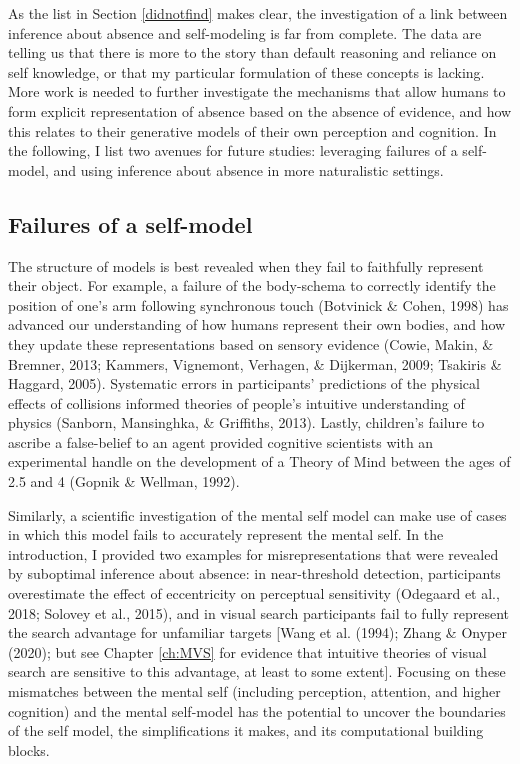 \documentclass[12pt,twoside]{reedthesis}
\begin{document}
As the list in Section \ref{didnotfind} makes clear, the investigation of a link between inference about absence and self-modeling is far from complete. The data are telling us that there is more to the story than default reasoning and reliance on self knowledge, or that my particular formulation of these concepts is lacking. More work is needed to further investigate the mechanisms that allow humans to form explicit representation of absence based on the absence of evidence, and how this relates to their generative models of their own perception and cognition. In the following, I list two avenues for future studies: leveraging failures of a self-model, and using inference about absence in more naturalistic settings.

\hypertarget{failures}{%
\subsection*{Failures of a self-model}\label{failures}}

The structure of models is best revealed when they fail to faithfully represent their object. For example, a failure of the body-schema to correctly identify the position of one's arm following synchronous touch (Botvinick \& Cohen, 1998) has advanced our understanding of how humans represent their own bodies, and how they update these representations based on sensory evidence (Cowie, Makin, \& Bremner, 2013; Kammers, Vignemont, Verhagen, \& Dijkerman, 2009; Tsakiris \& Haggard, 2005). Systematic errors in participants' predictions of the physical effects of collisions informed theories of people's intuitive understanding of physics (Sanborn, Mansinghka, \& Griffiths, 2013). Lastly, children's failure to ascribe a false-belief to an agent provided cognitive scientists with an experimental handle on the development of a Theory of Mind between the ages of 2.5 and 4 (Gopnik \& Wellman, 1992).

Similarly, a scientific investigation of the mental self model can make use of cases in which this model fails to accurately represent the mental self. In the introduction, I provided two examples for misrepresentations that were revealed by suboptimal inference about absence: in near-threshold detection, participants overestimate the effect of eccentricity on perceptual sensitivity (Odegaard et al., 2018; Solovey et al., 2015), and in visual search participants fail to fully represent the search advantage for unfamiliar targets {[}Wang et al. (1994); Zhang \& Onyper (2020); but see Chapter \ref{ch:MVS} for evidence that intuitive theories of visual search are sensitive to this advantage, at least to some extent{]}. Focusing on these mismatches between the mental self (including perception, attention, and higher cognition) and the mental self-model has the potential to uncover the boundaries of the self model, the simplifications it makes, and its computational building blocks.
\end{document}
